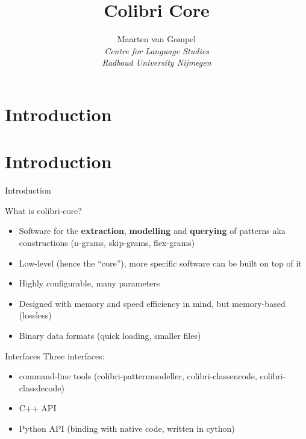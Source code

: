 \documentclass[compress]{beamer}
\title{Colibri Core}
\author{Maarten van Gompel \\ 
\emph{Centre for Language Studies} \\ \emph{Radboud University Nijmegen}}
\date{
\begin{center}
\texttt{[image: ru-beeldmerk-zwart.eps]}
\end{center}
August 28th, 2014}
\begin{document}
\section{Introduction}

\begin{frame}[fragile]
\maketitle
\end{frame}



\section{Introduction}


\begin{frame}{Introduction}
  \begin{block}{What is colibri-core?}
    \begin{itemize}
     \item Software for the \textbf{extraction}, \textbf{modelling} and
       \textbf{querying} of patterns aka constructions (n-grams, skip-grams, flex-grams)
     \item Low-level (hence the ``core''), more specific software can be built
       on top of it
     \item Highly configurable, many parameters
     \item Designed with memory and speed efficiency in mind, but memory-based
       (lossless)
     \item Binary data formats (quick loading, smaller files)
    \end{itemize}
  \end{block}
\end{frame}


\begin{frame}
  \begin{block}{Interfaces}
     Three interfaces:
      \begin{itemize}
        \item command-line tools (colibri-patternmodeller,
          colibri-classencode, colibri-classdecode)
        \item C++ API
        \item Python API (binding with native code, written in cython)
      \end{itemize}
  \end{block}
\end{frame}
\end{document}
